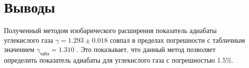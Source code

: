 \chapter{Выводы}
\label{ch:conclusions}

Полученный методом изобарического расширения показатель адиабаты углекислого газа $\gamma = 1.293 \pm 0.018$ совпал в пределах погрешности с табличным значением $\gamma_\text{табл} = 1.310$ \cite{Lab}. Это показывает, что данный метод позволяет определить показатель адиабаты для углекислого газа с погрешностью 1.5\%.
